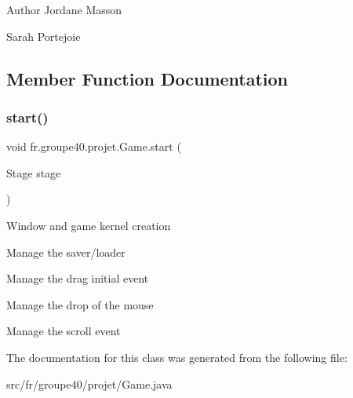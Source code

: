 \begin{DoxyAuthor}{Author}
Jordane Masson 

Sarah Portejoie 
\end{DoxyAuthor}


\subsection{Member Function Documentation}
\mbox{\label{classfr_1_1groupe40_1_1projet_1_1_game_a3700e488ecfb4fe5ff34bda5cb82b414}} 
\subsubsection{\texorpdfstring{start()}{start()}}
{\footnotesize\ttfamily void fr.\+groupe40.\+projet.\+Game.\+start (\begin{DoxyParamCaption}\item[{Stage}]{stage }\end{DoxyParamCaption})}

Window and game kernel creation

Manage the saver/loader

Manage the drag initial event

Manage the drop of the mouse

Manage the scroll event

The documentation for this class was generated from the following file\+:\begin{DoxyCompactItemize}
\item 
src/fr/groupe40/projet/Game.\+java\end{DoxyCompactItemize}
